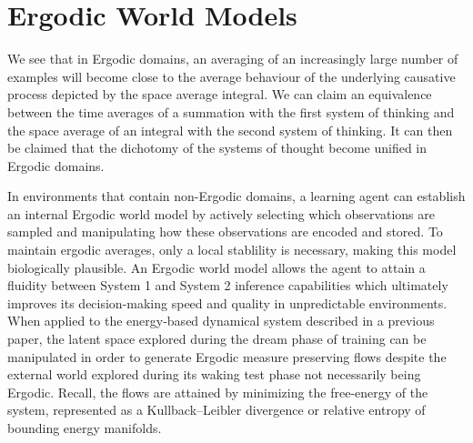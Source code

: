 \documentclass{article}
\begin{document}



\section{Ergodic World Models}


We see that in Ergodic domains, an averaging of an increasingly large number of examples will become close to the average behaviour of the underlying causative process depicted by the space average integral. We can claim an equivalence between the time averages of a summation with the first system of thinking and the space average of an integral with the second system of thinking. It can then be claimed that the dichotomy of the systems of thought become unified in Ergodic domains.

In environments that contain non-Ergodic domains, a learning agent can establish an internal Ergodic world model by actively selecting which observations are sampled and manipulating how these observations are encoded and stored. To maintain ergodic averages, only a local stablility is necessary, making this model biologically plausible. An Ergodic world model allows the agent to attain a fluidity between System 1 and System 2 inference capabilities which ultimately improves its decision-making speed and quality in unpredictable environments. When applied to the energy-based dynamical system described in a previous paper, the latent space explored during the dream phase of training can be manipulated in order to generate Ergodic measure preserving flows despite the external world explored during its waking test phase not necessarily being Ergodic. Recall, the flows are attained by minimizing the free-energy of the system, represented as a Kullback–Leibler divergence or relative entropy of bounding energy manifolds. 
\end{document}
